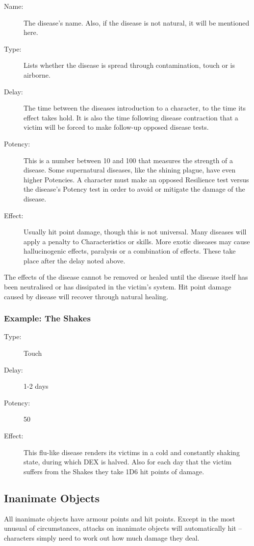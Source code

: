 \begin{description}
	\item[Name:] The disease’s name. Also, if the disease is not natural, it will be mentioned here. 
	\item[Type:] Lists whether the disease is spread through contamination, touch or is airborne. 
	\item[Delay:] The time between the diseases introduction to a character, to the time its effect takes hold. It is also the time following disease contraction that a victim will be forced to make follow-up opposed disease tests.
	\item[Potency:] This is a number between 10 and 100 that measures the strength of a disease. Some supernatural diseases, like the shining plague, have even higher Potencies. A character must make an opposed Resilience test versus the disease’s Potency test in order to avoid or mitigate the damage of the disease.
	\item[Effect:] Usually hit point damage, though this is not universal. Many diseases will apply a penalty to Characteristics or skills. More exotic diseases may cause hallucinogenic effects, paralysis or a combination of effects. These take place after the delay noted above. 
\end{description}

The effects of the disease cannot be removed or healed until the disease itself has been neutralised or has dissipated in the victim’s system. Hit point damage caused by disease will recover through natural healing.

\subsubsection{Example: The Shakes}

\begin{description}
\item[Type:] Touch
\item[Delay:] 1-2 days
\item[Potency:] 50
\item[Effect:] This flu-like disease renders its victims in a cold and constantly shaking state, during which DEX is halved. Also for each day that the victim suffers from the Shakes they take 1D6 hit points of damage.
\end{description}


\subsection{Inanimate Objects}
All inanimate objects have armour points and hit points. Except in the most unusual of circumstances, attacks on inanimate objects will automatically hit – characters simply need to work out how much damage they deal. 

